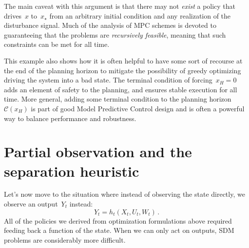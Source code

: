 \documentclass{tufte-book}
\begin{document}
The main caveat with this argument is that there may not \emph{exist} a
policy that drives~\(x\) to~\(x_\star\) from an arbitrary initial
condition and any realization of the disturbance signal. Much of the
analysis of MPC schemes is devoted to guaranteeing that the problems are
\emph{recursively feasible}, meaning that such constraints can be met
for all time.

This example also shows how it is often helpful to have some sort of
recourse at the end of the planning horizon to mitigate the possibility
of greedy optimizing driving the system into a bad state. The terminal
condition of forcing~\(x_H=0\) adds an element of safety to the
planning, and ensures stable execution for all time. More general,
adding some terminal condition to the planning
horizon~\(\mathcal{C}(x_{H})\) is part of good Model Predictive Control
design and is often a powerful way to balance performance and
robustness.

\hypertarget{partial-observation-and-the-separation-heuristic}{%
\section{Partial observation and the separation
heuristic}\label{partial-observation-and-the-separation-heuristic}}

Let's now move to the situation where instead of observing the state
directly, we observe an output~\(Y_t\) instead: \[
    Y_t = h_t(X_t,U_t,W_t)\,.
\] All of the policies we derived from optimization formulations above
required feeding back a function of the state. When we can only act on
outputs, SDM problems are considerably more difficult.
\end{document}
